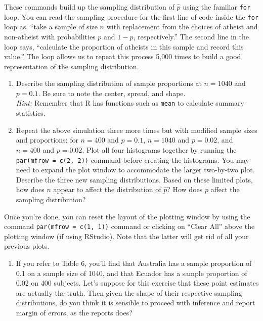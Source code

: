\documentclass[
]{article}
\providecommand{\tightlist}{%
  \setlength{\itemsep}{0pt}\setlength{\parskip}{0pt}}
\begin{document}
These commands build up the sampling distribution of \(\hat{p}\) using
the familiar \texttt{for} loop. You can read the sampling procedure for
the first line of code inside the \texttt{for} loop as, ``take a sample
of size \(n\) with replacement from the choices of atheist and
non-atheist with probabilities \(p\) and \(1 - p\), respectively.'' The
second line in the loop says, ``calculate the proportion of atheists in
this sample and record this value.'' The loop allows us to repeat this
process 5,000 times to build a good representation of the sampling
distribution.

\begin{enumerate}
\def\labelenumi{\arabic{enumi}.}
\setcounter{enumi}{8}
\item
  Describe the sampling distribution of sample proportions at
  \(n = 1040\) and \(p = 0.1\). Be sure to note the center, spread, and
  shape.\\
  \emph{Hint:} Remember that R has functions such as \texttt{mean} to
  calculate summary statistics.
\item
  Repeat the above simulation three more times but with modified sample
  sizes and proportions: for \(n = 400\) and \(p = 0.1\), \(n = 1040\)
  and \(p = 0.02\), and \(n = 400\) and \(p = 0.02\). Plot all four
  histograms together by running the \texttt{par(mfrow\ =\ c(2,\ 2))}
  command before creating the histograms. You may need to expand the
  plot window to accommodate the larger two-by-two plot. Describe the
  three new sampling distributions. Based on these limited plots, how
  does \(n\) appear to affect the distribution of \(\hat{p}\)? How does
  \(p\) affect the sampling distribution?
\end{enumerate}

Once you're done, you can reset the layout of the plotting window by
using the command \texttt{par(mfrow\ =\ c(1,\ 1))} command or clicking
on ``Clear All'' above the plotting window (if using RStudio). Note that
the latter will get rid of all your previous plots.

\begin{enumerate}
\def\labelenumi{\arabic{enumi}.}
\setcounter{enumi}{10}
\tightlist
\item
  If you refer to Table 6, you'll find that Australia has a sample
  proportion of 0.1 on a sample size of 1040, and that Ecuador has a
  sample proportion of 0.02 on 400 subjects. Let's suppose for this
  exercise that these point estimates are actually the truth. Then given
  the shape of their respective sampling distributions, do you think it
  is sensible to proceed with inference and report margin of errors, as
  the reports does?
\end{enumerate}
\end{document}
